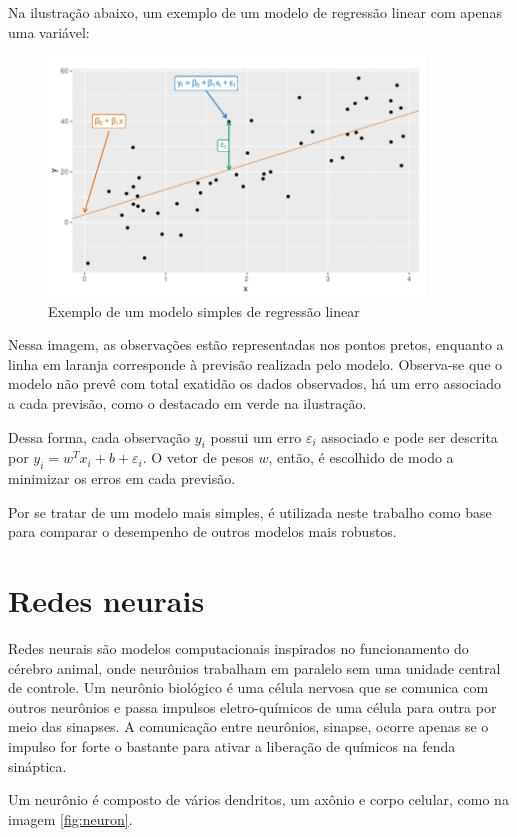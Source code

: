 Na ilustração abaixo, um exemplo de um modelo de regressão 
linear com apenas uma variável:

\begin{figure}[H] 
  \includegraphics[width= 10cm]{../figuras/reg_lin.png}
  \caption{Exemplo de um modelo simples de regressão linear
  \cite{forecasting}}
  \label{fig:reg_lin}
\end{figure}

Nessa imagem, as observações estão 
representadas nos pontos pretos, enquanto a linha em laranja
corresponde à previsão realizada pelo modelo. Observa-se que
o modelo não prevê com total exatidão os dados observados, há 
um erro associado a cada previsão, como o destacado em verde 
na ilustração.

Dessa forma, cada observação $y_i$ possui um erro ${\varepsilon}_i$ 
associado e pode ser descrita por $y_i = w^T x_i + b + {\varepsilon}_i$.
O vetor de pesos $w$, então, é escolhido de modo a minimizar 
os erros em cada previsão.

Por se tratar de um modelo mais simples, é utilizada neste trabalho como base 
para comparar o desempenho de outros modelos mais robustos.

\section{Redes neurais}

Redes neurais são modelos computacionais inspirados no funcionamento
do cérebro animal, onde neurônios trabalham em paralelo sem 
uma unidade central de controle. Um neurônio biológico é uma célula 
nervosa que se comunica com outros neurônios e passa impulsos 
eletro-químicos de uma célula para outra por meio das sinapses.
A comunicação entre neurônios, sinapse, ocorre apenas se o impulso 
for forte o bastante para ativar a liberação de
químicos na fenda sináptica.

Um neurônio é composto de vários dendritos, um axônio e corpo 
celular, como na imagem \ref{fig:neuron}. 

